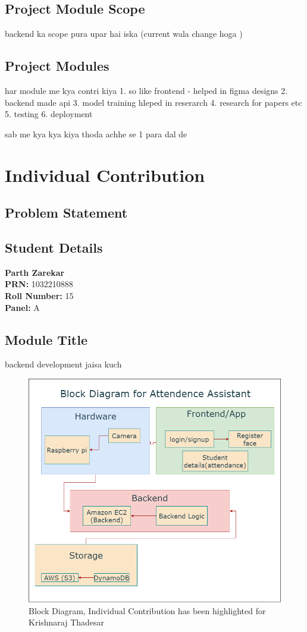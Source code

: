 \documentclass[openany]{report}
\begin{document}
\section{Project Module Scope}
backend ka scope pura upar hai iska (current wala change hoga )
\section{Project Modules}
har module me kya contri kiya
1. so like frontend - helped in figma designs
2. backend made api
3. model training hleped in reserarch
4. research for papers etc
5. testing
6. deployment

sab me kya kya kiya thoda achhe se 1 para dal de


\chapter{Individual Contribution}
\section{Problem Statement}
\section{Student Details}
\textbf{Parth Zarekar} \\
\textbf{PRN:} 1032210888 \\
\textbf{Roll Number:} 15 \\
\textbf{Panel:} A \\
\section{Module Title}
backend development  jaisa kuch
\begin{figure}[H]
    \centering
    \includegraphics[width=.95\textwidth]{../imgs/block diagram.png}
    \caption{Block Diagram, Individual Contribution has been highlighted for Krishnaraj Thadesar}
    \label{fig:block_diagram}
\end{figure}
\end{document}
